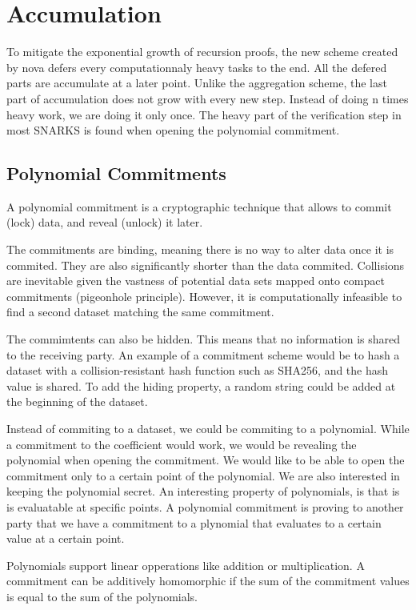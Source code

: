 
\section{Accumulation}
To mitigate the exponential growth of recursion proofs, the new scheme created by nova defers every computationnaly heavy tasks to the end. 
All the defered parts are accumulate at a later point. Unlike the aggregation scheme, the last part of accumulation does not grow with every new step.
Instead of doing n times heavy work, we are doing it only once.
The heavy part of the verification step in most SNARKS is found when opening the polynomial commitment.

\subsection{Polynomial Commitments}

A polynomial commitment is a cryptographic technique that allows to commit (lock) data, and reveal (unlock) it later.

The commitments are binding, meaning there is no way to alter data once it is commited. They are also significantly shorter than
the data commited. Collisions are inevitable given the vastness of potential data sets mapped onto compact commitments (pigeonhole principle).
However, it is computationally infeasible to find a second dataset matching the same commitment.

The commimtents can also be hidden. This means that no information is shared to the receiving party. 
An example of a commitment scheme would be to hash a dataset with a collision-resistant hash function such as SHA256, and the hash value is shared.
To add the hiding property, a random string could be added at the beginning of the dataset.

Instead of commiting to a dataset, we could be commiting to a polynomial. While a commitment to the coefficient would work, we would be revealing the polynomial
when opening the commitment. We would like to be able to open the commitment only to a certain point of the polynomial. 
We are also interested in keeping the polynomial secret. An interesting property of polynomials, is that is is evaluatable at specific points.
A polynomial commitment is proving to another party that we have a commitment to a plynomial that evaluates to a certain value at a certain point.

Polynomials support linear opperations like addition or multiplication. A commitment can be additively homomorphic if the sum of the commitment values
is equal to the sum of the polynomials.

